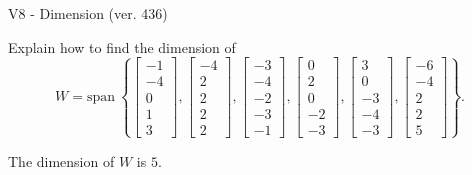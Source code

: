 \begin{exercise}
  \begin{exerciseTitle}V8 - Dimension (ver. 436)\end{exerciseTitle}
  \begin{exerciseStatement}
    Explain how to find the dimension of 
\[W=\mathrm{span}\ \left\{\left[\begin{array}{r}
-1 \\
-4 \\
0 \\
1 \\
3
\end{array}\right] , \left[\begin{array}{r}
-4 \\
2 \\
2 \\
2 \\
2
\end{array}\right] , \left[\begin{array}{r}
-3 \\
-4 \\
-2 \\
-3 \\
-1
\end{array}\right] , \left[\begin{array}{r}
0 \\
2 \\
0 \\
-2 \\
-3
\end{array}\right] , \left[\begin{array}{r}
3 \\
0 \\
-3 \\
-4 \\
-3
\end{array}\right] , \left[\begin{array}{r}
-6 \\
-4 \\
2 \\
2 \\
5
\end{array}\right]\right\}.\]



  \end{exerciseStatement}
  \begin{exerciseAnswer}
   The dimension of \(W\) is  \(5\).
  


  \end{exerciseAnswer}
\end{exercise}